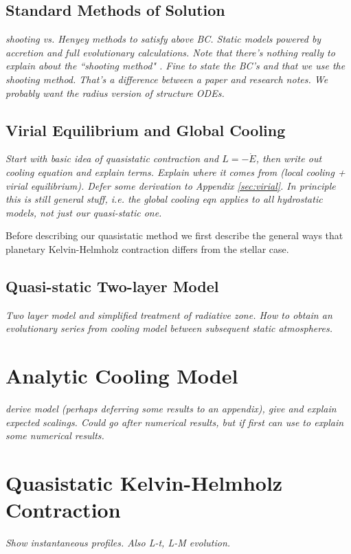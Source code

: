 \documentclass[apj]{emulateapj}
\newcommand{\emgr}[1]{\emph{ \color{gray} #1}}
\begin{document}
\subsection{Standard Methods of Solution} 
\emgr{shooting vs. Henyey methods to satisfy above BC. Static models powered by accretion and full evolutionary calculations. Note that there's nothing really to explain about the ``shooting method" .  Fine to state the BC's and that we use the shooting method.  That's a difference between a paper and research notes. We probably want the radius version of structure ODEs.}



\subsection{Virial Equilibrium and Global Cooling}
\emgr{Start with basic idea of quasistatic contraction and $L = -\dot{E}$, then write out cooling equation and explain terms.   Explain where it comes from (local cooling + virial equilibrium).   Defer some derivation to Appendix \ref{sec:virial}.  In principle this is still general stuff, i.e. the global cooling eqn applies to all hydrostatic models, not just our quasi-static one.}

Before describing our quasistatic method we first describe the general ways that planetary Kelvin-Helmholz contraction differs from the stellar case.

\subsection{Quasi-static Two-layer Model}
\emgr{Two layer model and simplified treatment of radiative zone. How to obtain an evolutionary series from cooling model between subsequent static atmospheres. }

\section{Analytic Cooling Model}
\emgr{derive model (perhaps deferring some results to an appendix), give and explain expected scalings.  Could go after numerical results, but if first can use to explain some numerical results.}



\section{Quasistatic Kelvin-Helmholz Contraction}
\emgr{Show instantaneous profiles. Also L-t, L-M evolution.}
\end{document}
